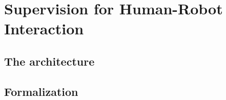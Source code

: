 \documentclass[english,a4paper,11pt,twoside]{StyleThese}
\begin{document}
\setcounter{chapter}{1} %
\dominitoc
\faketableofcontents
\fi

\chapter{Supervision for Human-Robot Interaction}
\minitoc

\section{The architecture}

\section{Formalization}

\ifdefined{}
\else


\end{document}

